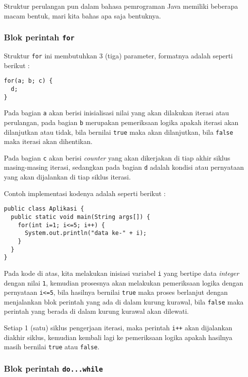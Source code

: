 Struktur perulangan pun dalam bahasa pemrograman Java memiliki beberapa macam bentuk, mari kita bahas apa saja bentuknya.

\subsubsection{Blok perintah \texttt{for}}

Struktur \texttt{for} ini membutuhkan 3 (tiga) parameter, formatnya adalah seperti berikut :

\begin{lstlisting}
for(a; b; c) {
  d;
}
\end{lstlisting}

Pada bagian \texttt{a} akan berisi inisialisasi nilai yang akan dilakukan iterasi atau perulangan, pada bagian \texttt{b} merupakan pemeriksaan logika apakah iterasi akan dilanjutkan atau tidak, bila bernilai \texttt{true} maka akan dilanjutkan, bila \texttt{false} maka iterasi akan dihentikan.

Pada bagian \texttt{c} akan berisi \textit{counter} yang akan dikerjakan di tiap akhir siklus masing-masing iterasi, sedangkan pada bagian \texttt{d} adalah kondisi atau pernyataan yang akan dijalankan di tiap siklus iterasi.

Contoh implementasi kodenya adalah seperti berikut :

\begin{lstlisting}
public class Aplikasi {
  public static void main(String args[]) {
    for(int i=1; i<=5; i++) {
      System.out.println("data ke-" + i);
    }
  }
}
\end{lstlisting}

Pada kode di atas, kita melakukan inisiasi variabel \texttt{i} yang bertipe data \textit{integer} dengan nilai \texttt{1}, kemudian prosesnya akan melakukan pemeriksaan logika dengan pernyataan \texttt{i<=5}, bila hasilnya bernilai \texttt{true} maka proses berlanjut dengan menjalankan blok perintah yang ada di dalam kurung kurawal, bila \texttt{false} maka perintah yang berada di dalam kurung kurawal akan dilewati.

Setiap 1 (satu) siklus pengerjaan iterasi, maka perintah \texttt{i++} akan dijalankan diakhir siklus, kemudian kembali lagi ke pemeriksaan logika apakah hasilnya masih bernilai \texttt{true} atau \texttt{false}.

\subsubsection{Blok perintah \texttt{do...while}}

